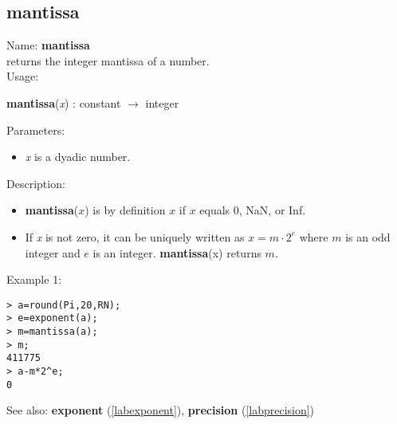 \subsection{mantissa}
\label{labmantissa}
\noindent Name: \textbf{mantissa}\\
returns the integer mantissa of a number.\\
\noindent Usage: 
\begin{center}
\textbf{mantissa}(\emph{x}) : \textsf{constant} $\rightarrow$ \textsf{integer}\\
\end{center}
Parameters: 
\begin{itemize}
\item \emph{x} is a dyadic number.
\end{itemize}
\noindent Description: \begin{itemize}

\item \textbf{mantissa}($x$) is by definition $x$ if $x$ equals 0, NaN, or Inf.

\item If \emph{x} is not zero, it can be uniquely written as $x = m \cdot 2^e$ where
   $m$ is an odd integer and $e$ is an integer. \textbf{mantissa}(x) returns $m$. 
\end{itemize}
\noindent Example 1: 
\begin{center}\begin{minipage}{15cm}\begin{Verbatim}[frame=single]
> a=round(Pi,20,RN);
> e=exponent(a);
> m=mantissa(a);
> m;
411775
> a-m*2^e;
0
\end{Verbatim}
\end{minipage}\end{center}
See also: \textbf{exponent} (\ref{labexponent}), \textbf{precision} (\ref{labprecision})

